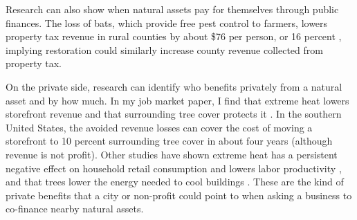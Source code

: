 \documentclass[12pt]{article}
\begin{document}
Research can also show when natural assets pay for themselves through public finances. The loss of bats, which provide free pest control to farmers, lowers property tax revenue in rural counties by about \$76 per person, or 16 percent \citep{nakhmurinaFiscalImpactBiodiversity2025}, implying restoration could similarly increase county revenue collected from property tax.

On the private side, research can identify who benefits privately from a natural asset and by how much. In my job market paper, I find that extreme heat lowers storefront revenue and that surrounding tree cover protects it \citep{creelValueNatureBasedAdaptation2026}. In the southern United States, the avoided revenue losses can cover the cost of moving a storefront to 10 percent surrounding tree cover in about four years (although revenue is not profit). Other studies have shown extreme heat has a persistent negative effect on household retail consumption \citep{leeExtremeTemperaturesAdaptation2025} and lowers labor productivity \citep{dasguptaHeatStressLabour2024, lopaloTemperatureWorkerProductivity2023}, and that trees lower the energy needed to cool buildings \citep{herisPilotingUrbanEcosystem2021, hanCoolCitiesValue2024}. These are the kind of private benefits that a city or non-profit could point to when asking a business to co-finance nearby natural assets.
\end{document}

